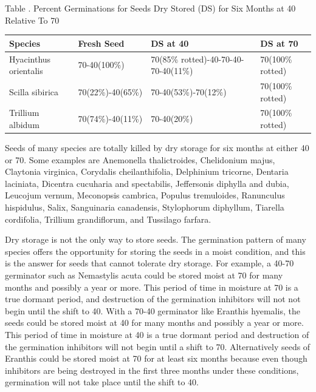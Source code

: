 \begin{table}[h!]

\begin{center}
Table \thetable. Percent Germinations for Seeds Dry Stored (DS) for Six Months
at 40 Relative To 70
\end{center}

\begin{tabular}{|l|l|p{2cm}|l|}
\hline
Species & Fresh Seed & DS at 40 & DS at 70 \\
\hline
Hyacinthus orientalis & 70-40(100\%)      & 70(85\% rotted)-40-70-40-70-40(11\%) & 70(100\% rotted) \\
Scilla sibirica       & 70(22\%)-40(65\%) & 70-40(53\%)-70(12\%)                 & 70(100\% rotted) \\
Trillium albidum      & 70(74\%)-40(11\%) & 70-40(20\%)                          & 70(100\% rotted) \\
\hline
\end{tabular}
\end{table}

Seeds of many species are totally killed by dry storage for six months at either
40 or 70. Some examples are Anemonella thalictroides, Chelidonium majus,
Claytonia virginica, Corydalis cheilanthifolia, Delphinium tricorne, Dentaria laciniata,
Dicentra cucuharia and spectabilis, Jeffersonis diphylla and dubia, Leucojum vernum,
Meconopsis cambrica, Populus tremuloides, Ranunculus hispidulus, Salix,
Sanguinaria canadensis, Stylophorum diphyllum, Tiarella cordifolia, Trillium
grandiflorum, and Tussilago farfara.

Dry storage is not the only way to store seeds. The germination pattern of many
species offers the opportunity for storing the seeds in a moist condition, and this is the
answer for seeds that cannot tolerate dry storage. For example, a 40-70 germinator
such as Nemastylis acuta could be stored moist at 70 for many months and possibly a
year or more. This period of time in moisture at 70 is a true dormant period, and
destruction of the germination inhibitors will not not begin until the shift to 40.
With a 70-40 germinator like Eranthis hyemalis, the seeds could be stored moist
at 40 for many months and possibly a year or more. This period of time in moisture at
40 is a true dormant period and destruction of the germination inhibitors will not begin
until a shift to 70. Alternatively seeds of Eranthis could be stored moist at 70 for at
least six months because even though inhibitors are being destroyed in the first three
months under these conditions, germination will not take place until the shift to 40.

